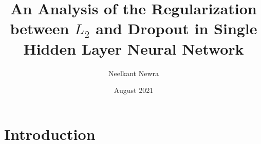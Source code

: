 \documentclass{article}
\title{\textbf{An Analysis of the Regularization between $L_2$ and Dropout in Single Hidden Layer Neural Network}}
\author{Neelkant Newra}
\date{August 2021}
\begin{document}
\maketitle

\section{Introduction}
\end{document}
